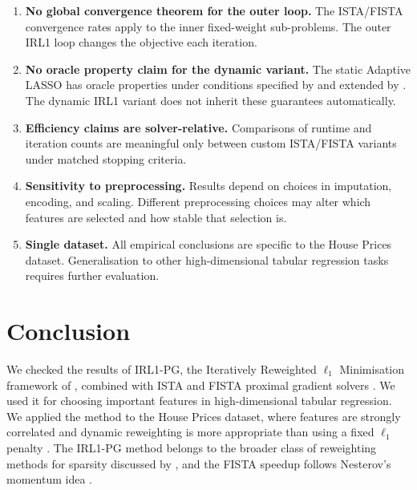 \documentclass[12pt,a4paper]{article}
\begin{document}
\begin{enumerate}
    \item \textbf{No global convergence theorem for the outer loop.}
          The ISTA/FISTA convergence rates \citep{beck2009} apply to the inner
          fixed-weight sub-problems.  The outer IRL1 loop changes the objective each
        iteration.

    \item \textbf{No oracle property claim for the dynamic variant.}
          The static Adaptive LASSO has oracle properties under conditions specified by
          \citet{zou2006} and extended by \citet{huang2008}.  The dynamic IRL1 variant
        does not inherit these guarantees automatically.

    \item \textbf{Efficiency claims are solver-relative.}
          Comparisons of runtime and iteration counts are meaningful only between custom
        ISTA/FISTA variants under matched stopping criteria.

    \item \textbf{Sensitivity to preprocessing.}
        Results depend on choices in imputation, encoding, and scaling.
          Different preprocessing choices may alter which features are selected and how
          stable that selection is.

    \item \textbf{Single dataset.}
          All empirical conclusions are specific to the House Prices dataset.
        Generalisation to other high-dimensional tabular regression tasks requires
        further evaluation.
\end{enumerate}

\section{Conclusion}
\label{sec:conclusion}

We checked the results of IRL1-PG, the Iteratively Reweighted $\ell_1$ Minimisation
framework of \citet{candes2008}, combined with ISTA and FISTA proximal gradient solvers
\citep{beck2009}. We used it for choosing important features in high-dimensional tabular
regression. We applied the method to the House Prices dataset, where features are strongly
correlated and dynamic reweighting is more appropriate than using a fixed $\ell_1$ penalty
\citep{zouhastie2005}. The IRL1-PG method belongs to the broader class of reweighting
methods for sparsity discussed by \citet{wipf2011}, and the FISTA speedup follows
Nesterov's momentum idea \citep{nesterov1983}.
\end{document}
